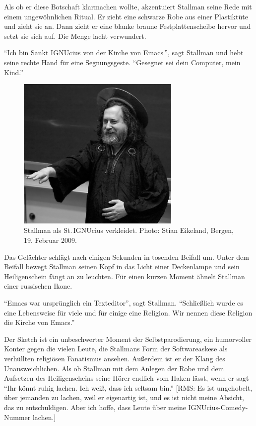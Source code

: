 Als ob er diese Botschaft klarmachen wollte, akzentuiert Stallman seine Rede mit einem ungewöhnlichen Ritual. Er zieht eine schwarze Robe aus einer Plastiktüte und zieht sie an. Dann zieht er eine blanke braune Festplattenscheibe hervor und setzt sie sich auf. Die Menge lacht verwundert.

"`Ich bin Sankt IGNUcius von der Kirche von Emacs\,"', sagt Stallman und hebt seine rechte Hand für eine Segnungsgeste. "`Gesegnet sei dein Computer, mein Kind."'

\begin{figure}[ht] \centering
  \includegraphics[width=0.7\textwidth]{stignucius}
  \caption{\small Stallman als St.\,IGNUcius verkleidet. Photo: Stian Eikeland, Bergen, 19. Februar 2009.}
\end{figure}

Das Gelächter schlägt nach einigen Sekunden in tosenden Beifall um. Unter dem Beifall bewegt Stallman seinen Kopf in das Licht einer Deckenlampe und sein Heiligenschein fängt an zu leuchten. Für einen kurzen Moment ähnelt Stallman einer russischen Ikone.

"`Emacs war ursprünglich ein Texteditor"', sagt Stallman. "`Schließlich wurde es eine Lebensweise für viele und für einige eine Religion. Wir nennen diese Religion die Kirche von Emacs."'

Der Sketch ist ein unbeschwerter Moment der Selbstparodierung, ein humorvoller Konter gegen die vielen Leute, die Stallmans Form der Softwareaskese als verhüllten religiösen Fanatismus ansehen. Außerdem ist er der Klang des Unausweichlichen. Als ob Stallman mit dem Anlegen der Robe und dem Aufsetzen des Heiligenscheins seine Hörer endlich vom Haken lässt, wenn er sagt "`Ihr könnt ruhig lachen. Ich weiß, dass ich seltsam bin."'  [RMS: Es ist ungehobelt, über jemanden zu lachen, weil er eigenartig ist, und es ist nicht meine Absicht, das zu entschuldigen. Aber ich hoffe, dass Leute über meine IGNUcius-Comedy-Nummer lachen.]

